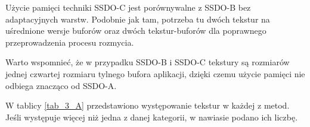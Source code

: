 		Użycie pamięci techniki SSDO-C jest porównywalne z SSDO-B bez adaptacyjnych warstw. Podobnie jak tam, potrzeba tu dwóch tekstur na uśrednione wersje buforów oraz dwóch tekstur-buforów dla poprawnego przeprowadzenia procesu rozmycia. 
		
		Warto wspomnieć, że w przypadku SSDO-B i SSDO-C tekstury są rozmiarów jednej czwartej rozmiaru tylnego bufora aplikacji, dzięki czemu użycie pamięci nie odbiega znacząco od SSDO-A.
		
		W tablicy \ref{tab_3_A} przedstawiono występowanie tekstur w każdej z metod. Jeśli występuje więcej niż jedna z danej kategorii, w nawiasie podano ich liczbę.
		
		